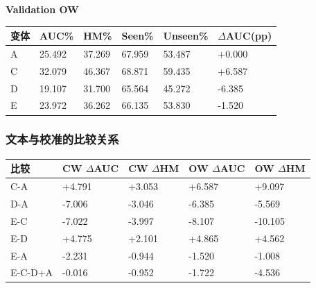 \documentclass[12pt,a4paper,UTF8]{ctexart}
\newenvironment{reporttable}{\par\smallskip\begingroup\small\centering}{\par\endgroup\smallskip}
\begin{document}
\noindent\textbf{Validation OW}\par\nopagebreak[4]

\begin{reporttable}

\begin{tabularx}{\linewidth}{|Z|Z|Z|Z|Z|Z|}
\hline

\textbf{变体} & \textbf{AUC\%} & \textbf{HM\%} & \textbf{Seen\%} & \textbf{Unseen\%} & \textbf{$\Delta$AUC(pp)} \\ \hline

A & 25.492 & 37.269 & 67.959 & 53.487 & +0.000 \\ \hline

C & 32.079 & 46.367 & 68.871 & 59.435 & +6.587 \\ \hline

D & 19.107 & 31.700 & 65.564 & 45.272 & -6.385 \\ \hline

E & 23.972 & 36.262 & 66.135 & 53.830 & -1.520 \\ \hline

\end{tabularx}\end{reporttable}


\subsubsection{文本与校准的比较关系}

\begin{reporttable}

\begin{tabularx}{\linewidth}{|Z|Z|Z|Z|Z|}
\hline

\textbf{比较} & \textbf{CW $\Delta$AUC} & \textbf{CW $\Delta$HM} & \textbf{OW $\Delta$AUC} & \textbf{OW $\Delta$HM} \\ \hline

C-A & +4.791 & +3.053 & +6.587 & +9.097 \\ \hline

D-A & -7.006 & -3.046 & -6.385 & -5.569 \\ \hline

E-C & -7.022 & -3.997 & -8.107 & -10.105 \\ \hline

E-D & +4.775 & +2.101 & +4.865 & +4.562 \\ \hline

E-A & -2.231 & -0.944 & -1.520 & -1.008 \\ \hline

E-C-D+A & -0.016 & -0.952 & -1.722 & -4.536 \\ \hline

\end{tabularx}\end{reporttable}
\end{document}
